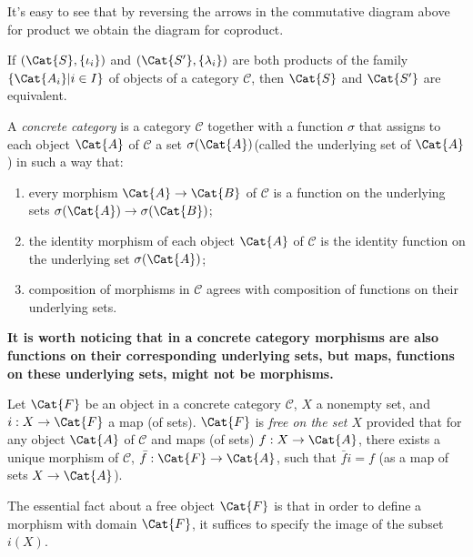 It's easy to see that by reversing the arrows in the commutative diagram above for product we obtain the diagram for coproduct. 
\begin{Theorem}
		If $ (\Cat{S},\{\iota_i \}) $ and $ (\Cat{S^\prime},\{\lambda_i\}) $ are both products of the family $ \{\Cat{A_i}|i\in I  \} $ of objects of a category $ \mathscr{C} $, then $ \Cat{S} $ and $ \Cat{S^{\prime}} $ are equivalent. 
\end{Theorem}
\begin{Definition}
	A \textit{concrete category} is a category $ \mathscr{C} $ together with a function $ \sigma $ that assigns to each object $ \Cat{A} $ of $ \mathscr{C} $ a set $ \sigma(\Cat{A}) $(called the underlying set of $ \Cat{A} $) in such a way that:
	\begin{enumerate}
		\item every morphism $ \Cat{A} \to \Cat{B} $ of $ \mathscr{C} $ is a function on the underlying sets $ \sigma(\Cat{A})\to \sigma(\Cat{B}) $;
		\item the identity morphism of each object $ \Cat{A} $ of $ \mathscr{C} $ is the identity function on the underlying set $ \sigma(\Cat{A}) $;
		\item composition of morphisms in $ \mathscr{C} $ agrees with composition of functions on their underlying sets.
	\end{enumerate}
\end{Definition}
\textbf{It is worth noticing that in a concrete category morphisms are also functions on their corresponding underlying sets, but maps, functions on these underlying sets, might not be morphisms.}
\begin{Definition}
	Let $ \Cat{F} $ be an object in a concrete category $ \mathscr{C} $, $ X $ a nonempty set, and $ i:X \to \Cat{F} $ a map (of sets). $ \Cat{F} $ is \textit{free on the set $ X $} provided that for any object $ \Cat{A} $ of $ \mathscr{C} $ and maps (of sets) $ f:X \to \Cat{A} $, there exists a unique morphism of $ \mathscr{C} $, $ \bar{f}:\Cat{F}\to \Cat{A} $, such that $ \bar{f}i=f $ (as a map of sets $ X \to \Cat{A} $).
\end{Definition}
\newpara
The essential fact about a free object $ \Cat{F} $ is that in order to define a morphism with domain $ \Cat{F} $, it suffices to specify the image of the subset $ i(X) $.

